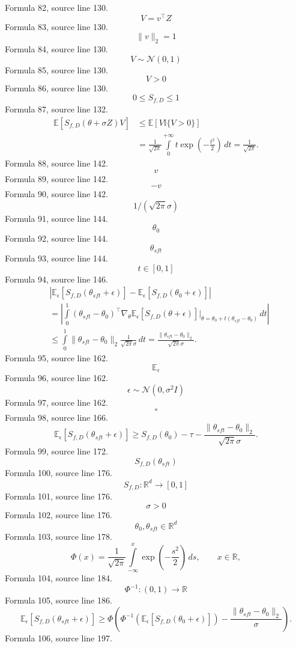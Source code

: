 \documentclass{ctexart}
\begin{document}
Formula 82, source line 130.
\[V=v^\top Z\]
Formula 83, source line 130.
\[\|v\|_2=1\]
Formula 84, source line 130.
\[V\sim\mathcal N(0,1)\]
Formula 85, source line 130.
\[V>0\]
Formula 86, source line 130.
\[0\leq S_{f,D}\leq1\]
Formula 87, source line 132.
\[
\begin{aligned}
\mathbb E\left[S_{f,D}(\theta+\sigma Z)V\right]
&\leq\mathbb E\left[V\mathbb I\{V>0\}\right]\\
&=\frac{1}{\sqrt{2\pi}}
\int\limits_0^{+\infty}t\exp\left(-\frac{t^2}{2}\right)\,dt
=\frac{1}{\sqrt{2\pi}}.
\end{aligned}
\]
Formula 88, source line 142.
\[v\]
Formula 89, source line 142.
\[-v\]
Formula 90, source line 142.
\[1/(\sqrt{2\pi}\sigma)\]
Formula 91, source line 144.
\[\theta_0\]
Formula 92, source line 144.
\[\theta_{sft}\]
Formula 93, source line 144.
\[t\in[0,1]\]
Formula 94, source line 146.
\[
\begin{aligned}
&\left|
\mathbb E_\epsilon\left[S_{f,D}(\theta_{sft}+\epsilon)\right]
-\mathbb E_\epsilon\left[S_{f,D}(\theta_0+\epsilon)\right]
\right|\\
&=\left|\int\limits_0^1
(\theta_{sft}-\theta_0)^\top
\nabla_\theta\mathbb E_\epsilon\left[S_{f,D}(\theta+\epsilon)\right]
\bigg|_{\theta=\theta_0+t(\theta_{sft}-\theta_0)}\,dt\right|\\
&\leq\int\limits_0^1
\|\theta_{sft}-\theta_0\|_2\frac{1}{\sqrt{2\pi}\sigma}\,dt
=\frac{\|\theta_{sft}-\theta_0\|_2}{\sqrt{2\pi}\sigma}.
\end{aligned}
\]
Formula 95, source line 162.
\[\mathbb E_\epsilon\]
Formula 96, source line 162.
\[\epsilon\sim\mathcal N(0,\sigma^2I)\]
Formula 97, source line 162.
\[\square\]
Formula 98, source line 166.
\[
\mathbb E_\epsilon\left[S_{f,D}(\theta_{sft}+\epsilon)\right]
\geq S_{f,D}(\theta_0)-\tau
-\frac{\|\theta_{sft}-\theta_0\|_2}{\sqrt{2\pi}\sigma}.
\]
Formula 99, source line 172.
\[S_{f,D}(\theta_{sft})\]
Formula 100, source line 176.
\[S_{f,D}:\mathbb R^d\to[0,1]\]
Formula 101, source line 176.
\[\sigma>0\]
Formula 102, source line 176.
\[\theta_0,\theta_{sft}\in\mathbb R^d\]
Formula 103, source line 178.
\[
\Phi(x)=\frac{1}{\sqrt{2\pi}}
\int\limits_{-\infty}^{x}\exp\left(-\frac{s^2}{2}\right)\,ds,
\qquad x\in\mathbb R,
\]
Formula 104, source line 184.
\[\Phi^{-1}:(0,1)\to\mathbb R\]
Formula 105, source line 186.
\[
\mathbb E_\epsilon\left[S_{f,D}(\theta_{sft}+\epsilon)\right]
\geq
\Phi\left(
\Phi^{-1}\left(
\mathbb E_\epsilon\left[S_{f,D}(\theta_0+\epsilon)\right]
\right)
-\frac{\|\theta_{sft}-\theta_0\|_2}{\sigma}
\right).
\]
Formula 106, source line 197.
\end{document}
